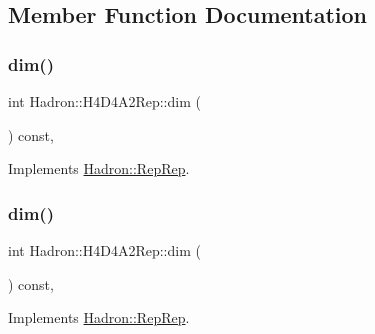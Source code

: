 \subsection{Member Function Documentation}
\mbox{\label{structHadron_1_1H4D4A2Rep_a6a4d1d831d61b10d0a66706229a04198}} 
\subsubsection{\texorpdfstring{dim()}{dim()}\hspace{0.1cm}{\footnotesize\ttfamily [1/5]}}
{\footnotesize\ttfamily int Hadron\+::\+H4\+D4\+A2\+Rep\+::dim (\begin{DoxyParamCaption}{ }\end{DoxyParamCaption}) const\hspace{0.3cm}{\ttfamily [inline]}, {\ttfamily [virtual]}}



Implements \mbox{\hyperlink{structHadron_1_1RepRep_a92c8802e5ed7afd7da43ccfd5b7cd92b}{Hadron\+::\+Rep\+Rep}}.

\mbox{\label{structHadron_1_1H4D4A2Rep_a6a4d1d831d61b10d0a66706229a04198}} 
\subsubsection{\texorpdfstring{dim()}{dim()}\hspace{0.1cm}{\footnotesize\ttfamily [2/5]}}
{\footnotesize\ttfamily int Hadron\+::\+H4\+D4\+A2\+Rep\+::dim (\begin{DoxyParamCaption}{ }\end{DoxyParamCaption}) const\hspace{0.3cm}{\ttfamily [inline]}, {\ttfamily [virtual]}}



Implements \mbox{\hyperlink{structHadron_1_1RepRep_a92c8802e5ed7afd7da43ccfd5b7cd92b}{Hadron\+::\+Rep\+Rep}}.

\mbox{\label{structHadron_1_1H4D4A2Rep_a6a4d1d831d61b10d0a66706229a04198}} 
